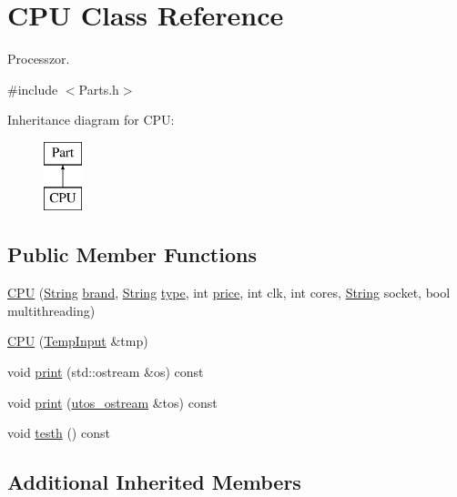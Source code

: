 \hypertarget{class_c_p_u}{}\section{C\+PU Class Reference}
\label{class_c_p_u}


Processzor.  




{\ttfamily \#include $<$Parts.\+h$>$}

Inheritance diagram for C\+PU\+:\begin{figure}[H]
\begin{center}
\leavevmode
\includegraphics[height=2.000000cm]{class_c_p_u}
\end{center}
\end{figure}
\subsection*{Public Member Functions}
\begin{DoxyCompactItemize}
\item 
\mbox{\hyperlink{class_c_p_u_a1aa85a6c976fe5b665dcb9fd6d8fdd1e}{C\+PU}} (\mbox{\hyperlink{class_string}{String}} \mbox{\hyperlink{class_part_ae06f2fdeb7fbbdb229a7aca151f3e341}{brand}}, \mbox{\hyperlink{class_string}{String}} \mbox{\hyperlink{class_part_a101dbcc5c4b21564df7414c7eb0eae88}{type}}, int \mbox{\hyperlink{class_part_a8e71223aed1da95a974f33d8d6c91bb1}{price}}, int clk, int cores, \mbox{\hyperlink{class_string}{String}} socket, bool multithreading)
\item 
\mbox{\hyperlink{class_c_p_u_a9147d84f815b9a242ba618877e6b2673}{C\+PU}} (\mbox{\hyperlink{struct_temp_input}{Temp\+Input}} \&tmp)
\item 
void \mbox{\hyperlink{class_c_p_u_ad4d3ebb288deeaad640e034bdb71a40a}{print}} (std\+::ostream \&os) const
\item 
void \mbox{\hyperlink{class_c_p_u_a0aea700bac0896b9e4434770737078d0}{print}} (\mbox{\hyperlink{structutos__ostream}{utos\+\_\+ostream}} \&tos) const
\item 
void \mbox{\hyperlink{class_c_p_u_a9e6b8807b179e06080d52f08e988bd57}{testh}} () const
\end{DoxyCompactItemize}
\subsection*{Additional Inherited Members}


